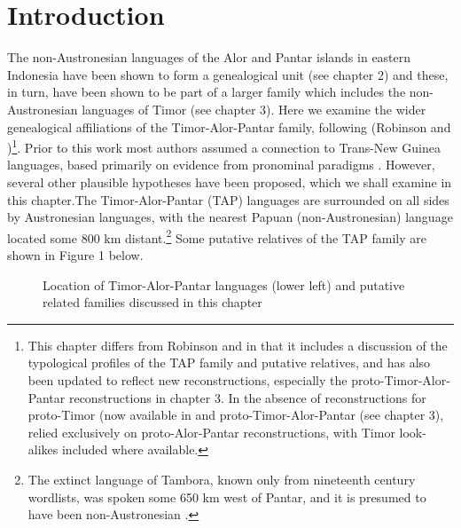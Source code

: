 \section{Introduction}
\hypertarget{Toc376958109}{}The non-Austronesian languages of the Alor and Pantar islands in eastern Indonesia have been shown to form a genealogical unit (see chapter 2) and these, in turn, have been shown to be part of a larger family which includes the non-Austronesian languages of Timor (see chapter 3). Here we examine the wider genealogical affiliations of the Timor-Alor-Pantar family, following (Robinson and \citet{Holton2012})\footnote{This chapter differs from Robinson and \citet{Holton2012} in that it includes a discussion of the typological profiles of the TAP family and putative relatives, and has also been updated to reflect new reconstructions, especially the proto-Timor-Alor-Pantar reconstructions in chapter 3. In the absence of reconstructions for proto-Timor (now available in \citet{SchapperEtAl2012} and proto-Timor-Alor-Pantar (see chapter 3), \citet{RobinsonEtAl2012} relied exclusively on proto-Alor-Pantar reconstructions, with Timor look-alikes included
where available. }. Prior to this work most authors assumed a connection to Trans-New Guinea languages, based primarily on evidence from pronominal paradigms \citep{Ross2005}. However, several other plausible hypotheses have been proposed, which we shall examine in this chapter.The Timor-Alor-Pantar (TAP) languages are surrounded on all sides by Austronesian languages, with the nearest Papuan (non-Austronesian) language located some 800 km distant.\footnote{The extinct language of Tambora, known only from nineteenth century wordlists, was spoken some 650 km west of Pantar, and it is presumed to have been non-Austronesian \citep{Donohue2007a}.} Some putative relatives of the TAP family are shown in Figure 1 below.

\begin{figure}
\caption{Location of Timor-Alor-Pantar languages (lower left) and putative related families discussed in this chapter}
\end{figure}

